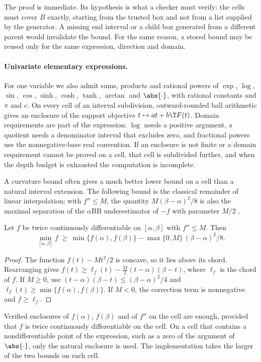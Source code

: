 The proof is immediate. Its hypothesis is what a checker must verify: the
cells must cover $B$ exactly, starting from the trusted box and not from a
list supplied by the generator. A missing end interval or a child box
generated from a different parent would invalidate the bound. For the same
reason, a stored bound may be reused only for the same expression, direction
and domain.

\paragraph{Univariate elementary expressions.}
For one variable we also admit sums, products and rational powers of $\exp$,
$\log$, $\sin$, $\cos$, $\sinh$, $\cosh$, $\tanh$, $\arctan$ and $\abs{\cdot}$,
with rational constants and $\pi$ and $e$. On every cell of an interval
subdivision, outward-rounded ball arithmetic \citep{Johansson2017arb} gives an
enclosure of the support objective $t\mapsto at+b\T F(t)$. Domain requirements
are part of the expression: $\log$ needs a positive argument, a quotient needs
a denominator interval that excludes zero, and fractional powers use the
nonnegative-base real convention. If an enclosure is not finite or a domain
requirement cannot be proved on a cell, that cell is subdivided further, and
when the depth budget is exhausted the computation is incomplete.

A curvature bound often gives a much better lower bound on a cell than a
natural interval extension. The following bound is the classical remainder of
linear interpolation; with $f''\le M$, the quantity $M(\beta-\alpha)^2/8$ is
also the maximal separation of the $\alpha$BB underestimator of $-f$ with
parameter $M/2$ \citep{AdjimanEtAl1998}.

\begin{lemma}\label{lem:chord}
Let $f$ be twice continuously differentiable on $[\alpha,\beta]$ with
$f''\le M$. Then
\[
\min_{[\alpha,\beta]}f\ \ge\ \min\{f(\alpha),f(\beta)\}-\max\{0,M\}\,(\beta-\alpha)^2/8.
\]
\end{lemma}

\begin{proof}
The function $f(t)-Mt^2/2$ is concave, so it lies above its chord. Rearranging
gives $f(t)\ge\ell_f(t)-\tfrac M2(t-\alpha)(\beta-t)$, where $\ell_f$ is the chord
of $f$. If $M\ge0$, use $(t-\alpha)(\beta-t)\le(\beta-\alpha)^2/4$ and
$\ell_f(t)\ge\min\{f(\alpha),f(\beta)\}$. If $M<0$, the correction term is
nonnegative and $f\ge\ell_f$.
\end{proof}

Verified enclosures of $f(\alpha)$, $f(\beta)$ and of $f''$ on the cell are
enough, provided that $f$ is twice continuously differentiable on the cell.
On a cell that contains a nondifferentiable point of the expression, such as
a zero of the argument of $\abs{\cdot}$, only the natural enclosure is used.
The implementation takes the larger of the two bounds on each cell.
